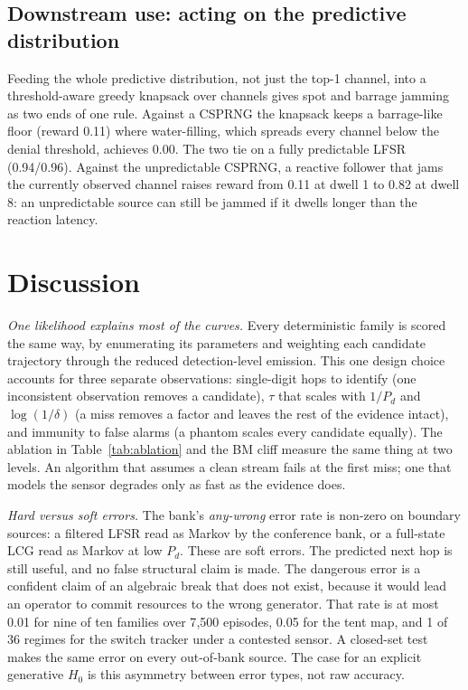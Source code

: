 \subsection{Downstream use: acting on the predictive distribution}
\label{sec:res-alloc}

Feeding the whole predictive distribution, not just the top-1 channel, into a
threshold-aware greedy knapsack over channels gives spot and barrage jamming as
two ends of one rule. Against a CSPRNG the knapsack keeps a barrage-like floor
(reward 0.11) where water-filling, which spreads every channel below the
denial threshold, achieves 0.00. The two tie on a fully predictable LFSR
(0.94/0.96). Against the unpredictable CSPRNG, a reactive follower that jams
the currently observed channel raises reward from 0.11 at dwell 1 to 0.82 at
dwell 8: an unpredictable source can still be jammed if it dwells longer than
the reaction latency.

\section{Discussion}
\label{sec:discussion}

\emph{One likelihood explains most of the curves.} Every deterministic family
is scored the same way, by enumerating its parameters and weighting each
candidate trajectory through the reduced detection-level emission. This one
design choice accounts for three separate observations: single-digit hops to
identify (one inconsistent observation removes a candidate), $\tau$ that
scales with $1/P_d$ and $\log(1/\delta)$ (a miss removes a factor and leaves
the rest of the evidence intact), and immunity to false alarms (a phantom
scales every candidate equally). The ablation in Table~\ref{tab:ablation} and
the BM cliff measure the same thing at two levels. An algorithm that assumes a
clean stream fails at the first miss; one that models the sensor degrades only
as fast as the evidence does.

\emph{Hard versus soft errors.} The bank's \emph{any-wrong} error rate is
non-zero on boundary sources: a filtered LFSR read as Markov by the conference
bank, or a full-state LCG read as Markov at low $P_d$. These are soft errors.
The predicted next hop is still useful, and no false structural claim is made.
The dangerous error is a confident claim of an algebraic break that does not
exist, because it would lead an operator to commit resources to the wrong
generator. That rate is at most 0.01 for nine of ten families over 7{,}500
episodes, 0.05 for the tent map, and 1 of 36 regimes for the switch tracker
under a contested sensor. A closed-set test makes the same error on every
out-of-bank source. The case for an explicit generative $H_0$ is this
asymmetry between error types, not raw accuracy.

